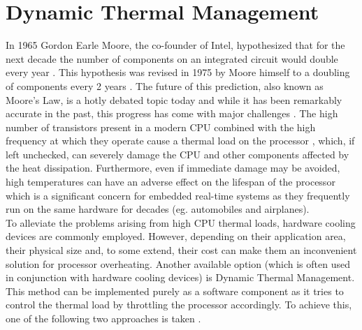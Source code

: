 \section{Dynamic Thermal Management}
In 1965 Gordon Earle Moore, the co-founder of Intel, hypothesized that for the next decade the number of components on an integrated circuit would double every year \cite{Moore1965}. This hypothesis was revised in 1975 by Moore himself to a doubling of components every 2 years \cite{Moore}. The future of this prediction, also known as Moore's Law, is a hotly debated topic today  and while it has been remarkably accurate in the past, this progress has come with major challenges \cite{Theis2017,Mack2015}. The high number of transistors present in a modern CPU combined with the high frequency at which they operate cause a thermal load on the processor \cite{Mutapcic2009}, which, if left unchecked, can severely damage the CPU and other components affected by the heat dissipation. Furthermore, even if immediate damage may be avoided, high temperatures can have an adverse effect on the lifespan of the processor \cite{Xiang2010,Srinivasan2004} which is a significant concern for embedded real-time systems as they frequently run on the same hardware for decades (eg. automobiles and airplanes).\\
\hspace*{0.5ex}\hspace{0.5ex} To alleviate the problems arising from high CPU thermal loads, hardware cooling devices are commonly employed. However, depending on their application area, their physical size and, to some extend, their cost can make them an inconvenient solution for processor overheating. Another available option (which is often used in conjunction with hardware cooling devices) is Dynamic Thermal Management. This method can be implemented purely as a software component as it tries to control the thermal load by throttling the processor accordingly. To achieve this, one of the following two approaches is taken \cite{Brooks}.
